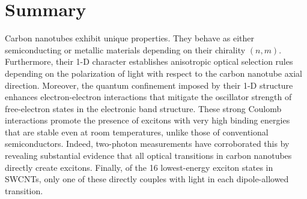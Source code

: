 %


\section{Summary}

Carbon nanotubes exhibit unique properties. They behave as either semiconducting or metallic materials depending on their chirality $(n,m)$. Furthermore, their 1-D character establishes anisotropic optical selection rules depending on the polarization of light with respect to the carbon nanotube axial direction. Moreover, the quantum confinement imposed by their 1-D structure enhances electron-electron interactions that mitigate the oscillator strength of free-electron states in the electronic band structure. These strong Coulomb interactions promote the presence of excitons with very high binding energies that are stable even at room temperatures, unlike those of conventional semiconductors. Indeed, two-photon measurements have corroborated this by revealing substantial evidence that all optical transitions in carbon nanotubes directly create excitons. Finally, of the 16 lowest-energy exciton states in SWCNTs, only one of these directly couples with light in each dipole-allowed transition.
